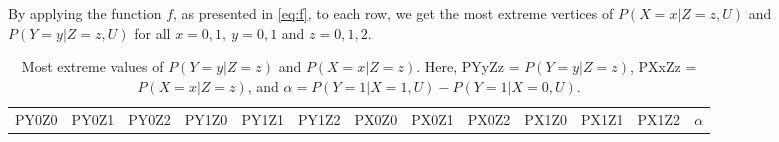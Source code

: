 \documentclass[
]{article}
\theoremstyle{plain}
\begin{document}
By applying the function \(f\), as presented in \eqref{eq:f}, to each row, we get the most extreme vertices of \(P(X = x | Z = z, U)\) and \(P(Y = y | Z = z, U)\) for all \(x=0,1,\ y=0,1\) and \(z=0,1,2\).

\begin{longtable}[]{@{}ccccccccccccc@{}}
\caption{Most extreme values of \(P(Y = y | Z = z)\) and \(P(X = x | Z = z)\). Here, PYyZz = \(P(Y = y | Z = z)\), PXxZz = \(P(X = x | Z = z)\), and \(\alpha = P(Y = 1 | X = 1,U) - P(Y = 1 | X = 0,U)\).\label{tab:vertices}}\tabularnewline
\toprule
\begin{minipage}[b]{0.05\columnwidth}\centering
PY0Z0\strut
\end{minipage} & \begin{minipage}[b]{0.05\columnwidth}\centering
PY0Z1\strut
\end{minipage} & \begin{minipage}[b]{0.05\columnwidth}\centering
PY0Z2\strut
\end{minipage} & \begin{minipage}[b]{0.05\columnwidth}\centering
PY1Z0\strut
\end{minipage} & \begin{minipage}[b]{0.05\columnwidth}\centering
PY1Z1\strut
\end{minipage} & \begin{minipage}[b]{0.05\columnwidth}\centering
PY1Z2\strut
\end{minipage} & \begin{minipage}[b]{0.05\columnwidth}\centering
PX0Z0\strut
\end{minipage} & \begin{minipage}[b]{0.05\columnwidth}\centering
PX0Z1\strut
\end{minipage} & \begin{minipage}[b]{0.05\columnwidth}\centering
PX0Z2\strut
\end{minipage} & \begin{minipage}[b]{0.05\columnwidth}\centering
PX1Z0\strut
\end{minipage} & \begin{minipage}[b]{0.05\columnwidth}\centering
PX1Z1\strut
\end{minipage} & \begin{minipage}[b]{0.05\columnwidth}\centering
PX1Z2\strut
\end{minipage} & \begin{minipage}[b]{0.07\columnwidth}\centering
\(\alpha\)\strut
\end{minipage}\tabularnewline

\end{longtable}
\end{document}
